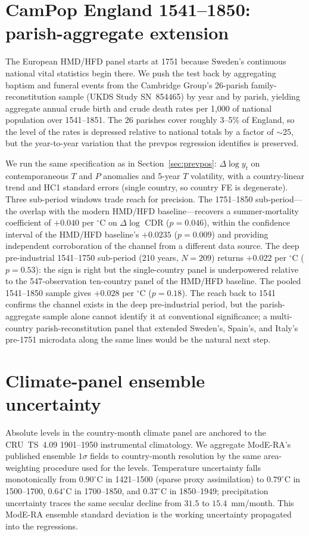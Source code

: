 \documentclass[11pt,letterpaper]{article}
\begin{document}
\section{CamPop England 1541--1850: parish-aggregate extension}
\label{app:campop}

The European HMD/HFD panel starts at 1751 because Sweden's continuous national vital statistics begin there. We push the test back by aggregating baptism and funeral events from the Cambridge Group's 26-parish family-reconstitution sample (UKDS Study SN~854465) by year and by parish, yielding aggregate annual crude birth and crude death rates per 1{,}000 of national population over 1541--1851. The 26 parishes cover roughly 3--5\% of England, so the level of the rates is depressed relative to national totals by a factor of $\sim 25$, but the year-to-year variation that the prevpos regression identifies is preserved.

We run the same specification as in Section~\ref{sec:prevpos}: $\Delta \log y_t$ on contemporaneous $T$ and $P$ anomalies and 5-year $T$ volatility, with a country-linear trend and HC1 standard errors (single country, so country FE is degenerate). Three sub-period windows trade reach for precision. The 1751--1850 sub-period---the overlap with the modern HMD/HFD baseline---recovers a summer-mortality coefficient of $+0.040$ per $^\circ$C on $\Delta \log$ CDR ($p=0.046$), within the confidence interval of the HMD/HFD baseline's $+0.0235$ ($p=0.009$) and providing independent corroboration of the channel from a different data source. The deep pre-industrial 1541--1750 sub-period (210 years, $N=209$) returns $+0.022$ per $^\circ$C ($p=0.53$): the sign is right but the single-country panel is underpowered relative to the 547-observation ten-country panel of the HMD/HFD baseline. The pooled 1541--1850 sample gives $+0.028$ per $^\circ$C ($p=0.18$). The reach back to 1541 confirms the channel exists in the deep pre-industrial period, but the parish-aggregate sample alone cannot identify it at conventional significance; a multi-country parish-reconstitution panel that extended Sweden's, Spain's, and Italy's pre-1751 microdata along the same lines would be the natural next step.

\section{Climate-panel ensemble uncertainty}
\label{app:ensemble-uncertainty}

Absolute levels in the country-month climate panel are anchored to the CRU~TS~4.09 1901--1950 instrumental climatology. We aggregate ModE-RA's published ensemble $1\sigma$ fields to country-month resolution by the same area-weighting procedure used for the levels. Temperature uncertainty falls monotonically from $0.90^\circ$C in 1421--1500 (sparse proxy assimilation) to $0.79^\circ$C in 1500--1700, $0.64^\circ$C in 1700--1850, and $0.37^\circ$C in 1850--1949; precipitation uncertainty traces the same secular decline from $31.5$ to $15.4$~mm/month. This ModE-RA ensemble standard deviation is the working uncertainty propagated into the regressions.
\end{document}
